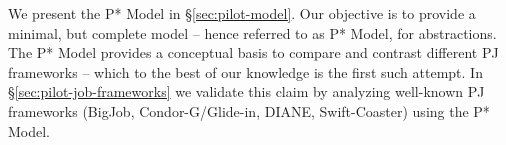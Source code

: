 \documentclass[conference]{IEEEtran}
\begin{document}











We present the P* Model in \S\ref{sec:pilot-model}. Our objective is to provide
a minimal, but complete model -- hence referred to as P* Model, for \pilotjob
abstractions. The P* Model provides a conceptual basis to compare and contrast
different PJ frameworks -- which to the best of our knowledge is the first such
attempt. In \S\ref{sec:pilot-job-frameworks} we validate this claim by analyzing
well-known PJ frameworks (BigJob, Condor-G/Glide-in, DIANE, Swift-Coaster) using
the P* Model.
\end{document}
